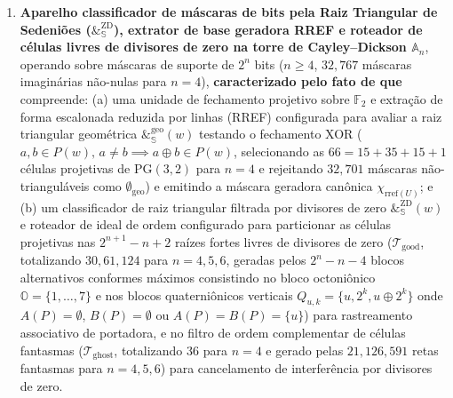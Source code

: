\documentclass[12pt,a4paper]{article}
\begin{document}
\begin{enumerate}[leftmargin=20pt,itemsep=4pt]
    \item \textbf{Aparelho classificador de m\'ascaras de bits pela Raiz Triangular de Sedeni\~oes ($\&_{\mathbb{S}}^{\mathrm{ZD}}$), extrator de base geradora RREF e roteador de c\'elulas livres de divisores de zero na torre de Cayley--Dickson $\mathbb{A}_n$}, operando sobre m\'ascaras de suporte de $2^n$ bits ($n \ge 4$, $32{,}767$ m\'ascaras imagin\'arias n\~ao-nulas para $n = 4$), \textbf{caracterizado pelo fato de que} compreende: (a) uma unidade de fechamento projetivo sobre $\mathbb{F}_2$ e extra\c{c}\~ao de forma escalonada reduzida por linhas (RREF) configurada para avaliar a raiz triangular geom\'etrica $\&_{\mathbb{S}}^{\mathrm{geo}}(w)$ testando o fechamento XOR ($a,b \in P(w),\, a \neq b \implies a \oplus b \in P(w)$, selecionando as $66 = 15 + 35 + 15 + 1$ c\'elulas projetivas de $\mathrm{PG}(3,2)$ para $n = 4$ e rejeitando $32{,}701$ m\'ascaras n\~ao-triangul\'aveis como $\emptyset_{\mathrm{geo}}$) e emitindo a m\'ascara geradora can\^onica $\chi_{\mathrm{rref}(U)}$; e (b) um classificador de raiz triangular filtrada por divisores de zero $\&_{\mathbb{S}}^{\mathrm{ZD}}(w)$ e roteador de ideal de ordem configurado para particionar as c\'elulas projetivas nas $2^{n+1} - n + 2$ ra\'izes fortes livres de divisores de zero ($\mathcal{T}_{\mathrm{good}}$, totalizando $30, 61, 124$ para $n = 4, 5, 6$, geradas pelos $2^n - n - 4$ blocos alternativos conformes m\'aximos consistindo no bloco octoni\^onico $\mathbb{O} = \{1,\dots,7\}$ e nos blocos quaterni\^onicos verticais $Q_{u,k} = \{u, 2^k, u \oplus 2^k\}$ onde $A(P)=\emptyset$, $B(P)=\emptyset$ ou $A(P)=B(P)=\{u\}$) para rastreamento associativo de portadora, e no filtro de ordem complementar de c\'elulas fantasmas ($\mathcal{T}_{\mathrm{ghost}}$, totalizando $36$ para $n = 4$ e gerado pelas $21, 126, 591$ retas fantasmas para $n = 4, 5, 6$) para cancelamento de interfer\^encia por divisores de zero.
\end{enumerate}

\newpage
\end{document}
